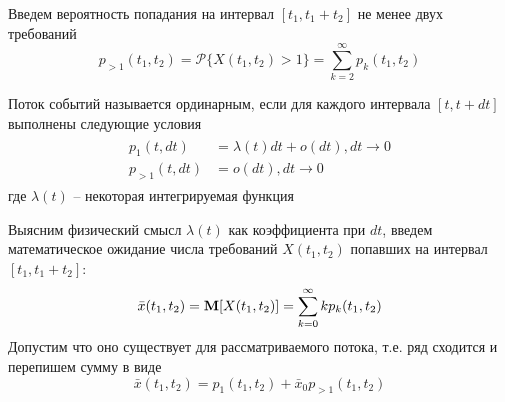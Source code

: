 Введем вероятность попадания на интервал $[t_1, t_1 + t_2]$ не менее двух требований
$$p_{>1}(t_1, t_2) = \mathcal{P}\{X(t_1, t_2) > 1\} = \sum_{k=2}^{\infty}{p_k (t_1, t_2)}$$

\begin{definition}
	Поток событий называется {\color{red}ординарным}, если для каждого интервала $[t, t + dt]$ выполнены следующие условия
	\begin{align}\label{eq:4}
	\begin{split}
		p_1 (t, dt) &= \lambda(t) dt + o(dt), dt \to 0 \\
		p_{>1}(t, dt) &= o(dt), dt \to 0
	\end{split}
	\end{align}
	где $\lambda(t)$ -- некоторая интегрируемая функция
\end{definition}

Выясним физический смысл $\lambda(t)$ как коэффициента при $dt$, введем математическое ожидание числа требований $X(t_1, t_2)$ попавших на интервал $[t_1, t_1 + t_2]$:
$$\bar{x}(t_1, t_2) = \mathbf{M}[X(t_1, t_2)] = \sum_{k=0}^{\infty}{k p_k (t_1, t_2)}$$
Допустим что оно существует для рассматриваемого потока, т.е. ряд сходится и перепишем сумму в виде
\begin{equation}\label{eq:1}
	\bar{x}(t_1, t_2) = p_1 (t_1, t_2) + \bar{x}_0 p_{>1} (t_1, t_2)
\end{equation}

